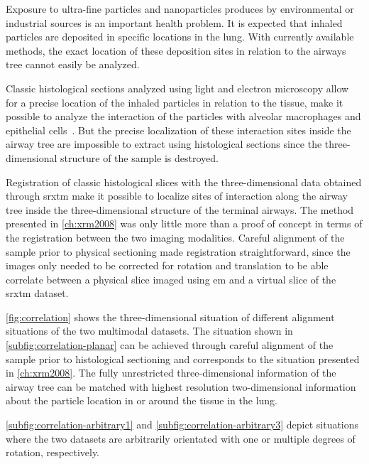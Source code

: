 Exposure to ultra-fine particles and nanoparticles produces by environmental or industrial sources is an important health problem. It is expected that inhaled particles are deposited in specific locations in the lung. With currently available methods, the exact location of these deposition sites in relation to the airways tree cannot easily be analyzed. 

Classic histological sections analyzed using light and electron microscopy allow for a precise location of the inhaled particles in relation to the tissue, \ie make it possible to analyze the interaction of the particles with alveolar macrophages and epithelial cells~\cite{Muhlfeld2008}. But the precise localization of these interaction sites inside the airway tree are impossible to extract using histological sections since the three-dimensional structure of the sample is destroyed.

Registration of classic histological slices with the three-dimensional data obtained through \ac{srxtm} make it possible to localize sites of interaction along the airway tree inside the three-dimensional structure of the terminal airways. The method presented in \autoref{ch:xrm2008} was only little more than a proof of concept in terms of the registration between the two imaging modalities. Careful alignment of the sample prior to physical sectioning made registration straightforward, since the images only needed to be corrected for rotation and translation to be able correlate between a physical slice imaged using \ac{em} and a virtual slice of the \ac{srxtm} dataset.

\autoref{fig:correlation} shows the three-dimensional situation of different alignment situations of the two multimodal datasets. The situation shown in \autoref{subfig:correlation-planar} can be achieved through careful alignment of the sample prior to histological sectioning and corresponds to the situation presented in \autoref{ch:xrm2008}. The fully unrestricted three-dimensional information of the airway tree can be matched with highest resolution two-dimensional information about the particle location in or around the tissue in the lung.

\autoref{subfig:correlation-arbitrary1} and \ref{subfig:correlation-arbitrary3} depict situations where the two datasets are arbitrarily orientated with one or multiple degrees of rotation, respectively.

